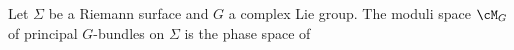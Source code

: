 Let $\Sigma$ be a Riemann surface and $G$ a complex Lie group.
The moduli space $\cM_G$ of principal $G$-bundles on $\Sigma$ is the phase space of  
